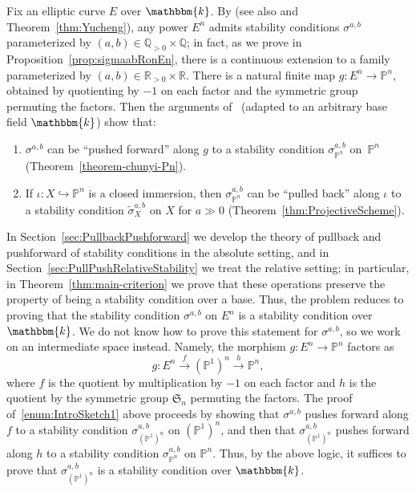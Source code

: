 \documentclass[11pt, reqno]{amsart}
\numberwithin{equation}{section}
\theoremstyle{plain}
\theoremstyle{remark}
\theoremstyle{definition}
\theoremstyle{italicsname}
\newcommand{\wtilde}{\widetilde}
\newcommand{\fS}{\mathfrak{S}}
\newcommand{\KK}{\mathbbm{k}}
\def\QQ{\ensuremath{\mathbb{Q}}}
\def\RR{\ensuremath{\mathbb{R}}}
\def\PP{\ensuremath{\mathbb{P}}}
\begin{document}
Fix an elliptic curve $E$ over $\KK$. 
By \cite{Liu:StabProd} (see also \cite{curves} and Theorem~\ref{thm:Yucheng}), any power $E^n$ admits stability conditions $\sigma^{a,b}$ parameterized by $(a,b)\in \QQ_{>0}\times\QQ$; in fact, as we prove in Proposition~\ref{prop:sigmaabRonEn}, there is a continuous extension to a family parameterized by $(a,b) \in \RR_{>0} \times \RR$. 
There is a natural finite map $g \colon E^n\to\PP^n$, obtained by quotienting by $-1$ on each factor and the symmetric group permuting the factors. 
Then the arguments of~\cite{chunyi-stability} (adapted to an arbitrary base field $\KK$) show that:  
\begin{enumerate}[{\rm (i)}]
    \item\label{enum:IntroSketch1} $\sigma^{a,b}$ can be ``pushed forward'' along $g$ to a stability condition $\sigma_{\PP^n}^{a,b}$ on~$\PP^n$ (Theorem~\ref{theorem-chunyi-Pn}). 
    \item\label{enum:IntroSketch2} 
    If $\iota \colon X \hookrightarrow \PP^n$ is a closed immersion, then 
    $\sigma^{a,b}_{\PP^n}$ can be ``pulled back'' along $\iota$ to a stability condition $\wtilde{\sigma}_X^{a,b}$ on $X$  for $a \gg 0$ (Theorem~\ref{thm:ProjectiveScheme}). 
\end{enumerate}

In Section~\ref{sec:PullbackPushforward} we develop the theory of pullback and pushforward of stability conditions in the absolute setting, and in Section~\ref{sec:PullPushRelativeStability} we treat the relative setting; in particular, in Theorem~\ref{thm:main-criterion} we prove that these operations preserve the property of being a stability condition over a base. 
Thus, the problem reduces to proving that the stability condition $\sigma^{a,b}$ on $E^n$ is a stability condition over $\KK$.  
We do not know how to prove this statement for $\sigma^{a,b}$, so we work on an intermediate space instead. 
Namely, the morphism $g \colon E^n \to \PP^n$ factors as 
\begin{equation*}
    g \colon E^n \xrightarrow{\, f \,} (\PP^1)^n \xrightarrow{\, h \,} \PP^n, 
\end{equation*}
where $f$ is the quotient by multiplication by $-1$ on each factor and $h$ is the quotient by the symmetric group $\fS_n$ permuting the factors. 
The proof of~\ref{enum:IntroSketch1} above proceeds by showing that $\sigma^{a,b}$ pushes forward along $f$ to a stability condition $\sigma^{a,b}_{(\PP^1)^n}$ on $(\PP^1)^n$, 
and then that $\sigma^{a,b}_{(\PP^1)^n}$ pushes forward along $h$ to a stability condition $\sigma^{a,b}_{\PP^n}$ on $\PP^n$. 
Thus, by the above logic, it suffices to prove that $\sigma^{a,b}_{(\PP^1)^n}$ is a stability condition over $\KK$. 
\end{document}
